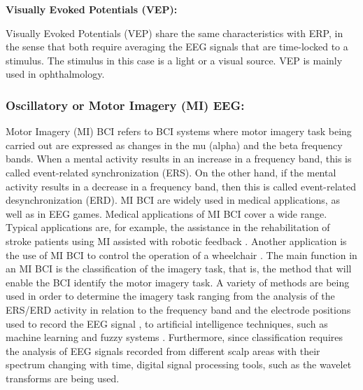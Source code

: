 \vspace {15pt}
\textbf{Visually Evoked Potentials (VEP):}

Visually Evoked Potentials (VEP) share the same characteristics with ERP, in the sense that both require averaging the EEG signals that are time-locked to a stimulus. The stimulus in this case is a light or a visual source. VEP is mainly used in ophthalmology.  

\subsubsection{\bf{Oscillatory or Motor Imagery (MI) EEG:}}
Motor Imagery (MI) BCI refers to BCI systems where motor imagery task being carried out are expressed as changes in the mu (alpha) and the beta frequency bands. When a mental activity results in an increase in a frequency band, this is called event-related synchronization (ERS). On the other hand, if the mental activity results in a decrease in a frequency band, then this is called event-related desynchronization (ERD).  MI BCI are widely used in medical applications, as well as in EEG games. 
Medical applications of MI BCI cover a wide range. Typical applications are, for example, the assistance in the rehabilitation of stroke patients using MI assisted with robotic feedback  \citep{Kai2010}. Another application is the use of MI BCI to control the operation of a wheelchair  \citep{Gala2008}.
The main function in an MI BCI is the classification of the imagery task, that is, the method that will enable the BCI identify the motor imagery task. A variety of methods are being used in order to determine the imagery task ranging from the analysis of the ERS/ERD activity in relation to the frequency band and the electrode positions used to record the EEG signal  \citep{Wolpaw2004, Pfurtscheller2006}, to artificial intelligence techniques, such as machine learning and fuzzy systems  \citep{Xu2009}. Furthermore, since classification requires the analysis of EEG signals recorded from different scalp areas with their spectrum changing with time, digital signal processing tools, such as the wavelet transforms  \citep{Ahmadi2012} are being used.  

